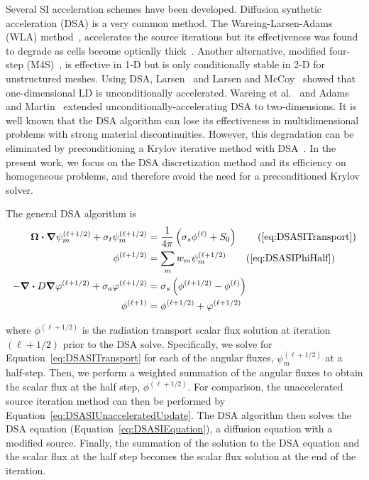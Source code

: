 \documentclass[12pt,letterpaper]{article}
\begin{document}
Several SI acceleration schemes have been developed. Diffusion synthetic acceleration (DSA) is a very common method. The Wareing-Larsen-Adams (WLA) method~\cite{WareingDSADFEM}, accelerates the source iterations but its effectiveness was found to degrade as cells become optically thick~\cite{WarsaFullyConsistentLDDSA}. Another alternative, modified four-step (M4S)~\cite{AdamsFastIterativeMethods}, is effective in 1-D but is only conditionally stable in 2-D for unstructured meshes. Using DSA, Larsen~\cite{LarsenStableDSATheory} and Larsen and McCoy~\cite{LarsenStableDSANumericalResults} showed that one-dimensional LD is unconditionally accelerated. Wareing et al.~\cite{WareingDSADFEM} and Adams and Martin~\cite{AdamsDSADFEM} extended unconditionally-accelerating DSA to two-dimensions. It is well known that the DSA algorithm can lose its effectiveness in multidimensional problems with strong material discontinuities. However, this degradation can be eliminated by preconditioning a Krylov iterative method with DSA~\cite{WarsaKrylovDSA}. In the present work, we focus on the DSA discretization method and its efficiency on homogeneous problems, and therefore avoid the need for a preconditioned Krylov solver.

The general DSA algorithm is
\begin{subequations}
\begin{flalign}
\vec{\Omega} \vd \grad \psi_m^{(\ell+1/2)} + \sigma_t \psi_m^{(\ell+1/2)} & = \frac{1}{4 \pi} \left(\sigma_s \phi^{(\ell)} + S_0 \right) \tag{\ref{eq:DSASITransport}} \\
\phi^{(\ell+1/2)} & = \sum_m w_m \psi_m^{(\ell+1/2)} \tag{\ref{eq:DSASIPhiHalf}} \\
-\grad \vd D \grad \varphi^{(\ell+1/2)} + \sigma_a \varphi^{(\ell+1/2)} & = \sigma_s \left(\phi^{(\ell+1/2)} - \phi^{(\ell)} \right) \label{eq:DSASIEquation} \\
\phi^{(\ell+1)} & = \phi^{(\ell+1/2)} + \varphi^{(\ell+1/2)} \label{eq:DSASIPhiEnd}
\end{flalign}
\label{eqs:DSAAlgorithm}
\end{subequations}

\noindent where $\phi^{(\ell+1/2)}$ is the radiation transport scalar flux solution at iteration $(\ell+1/2)$ prior to the DSA solve. Specifically, we solve for Equation~\ref{eq:DSASITransport} for each of the angular fluxes, $\psi^{(\ell+1/2)}_m$ at a half-step. Then, we perform a weighted summation of the angular fluxes to obtain the scalar flux at the half step, $\phi^{(\ell+1/2)}$. For comparison, the unaccelerated source iteration method can then be performed by Equation~\ref{eq:DSASIUnacceleratedUpdate}. The DSA algorithm then solves the DSA equation (Equation~\ref{eq:DSASIEquation}), a diffusion equation with a modified source. Finally, the summation of the solution to the DSA equation and the scalar flux at the half step becomes the scalar flux solution at the end of the iteration.
\end{document}
